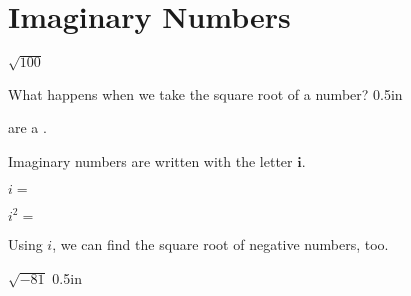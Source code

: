 \section*{Imaginary Numbers}
    {
        $\sqrt{100}$
        \tcblower
    }

\vspace{1\onelineskip}
What happens when we take the square root of a  number?
    {0.5in}

    \noindent\vspace{1\onelineskip}
    are a    .

    \vspace{-1\onelineskip}
    \begin{center}
        \small
        \centering
        \begin{tcolorbox}[width=6in,colback=white]
            \begin{minipage}{0.4\textwidth}
                Imaginary numbers are written with the letter {\large $\bm{i}$}.
            \end{minipage}
            \hfill
            \begin{minipage}{0.25\textwidth}
                $i =$ 
            \end{minipage}
            \hfill
            \begin{minipage}{0.25\textwidth}
                $i^2 = $ 
            \end{minipage}
        \end{tcolorbox}
    \end{center}
    \vspace{-1\onelineskip}
    Using $i$,
    we can find the square root of negative numbers, too.
    
    {
        $\sqrt{-81}$
    }
    {0.5in}
